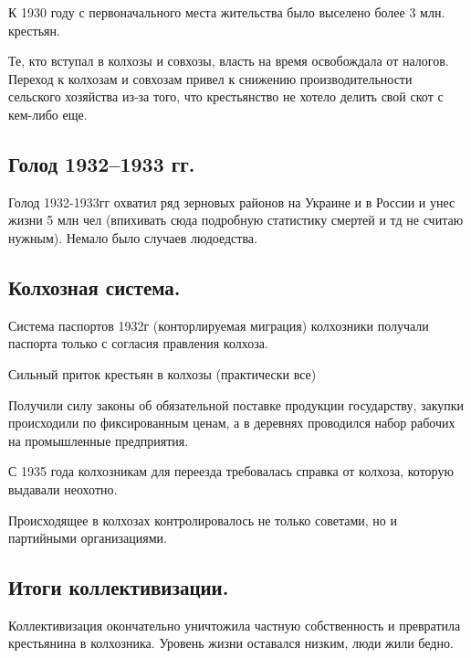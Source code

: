 К 1930 году с первоначального места жительства было выселено более 3 млн. крестьян.

Те, кто вступал в колхозы и совхозы, власть на время освобождала от налогов. Переход к колхозам и совхозам привел к снижению производительности сельского хозяйства из-за того, что крестьянство не хотело делить свой скот с кем-либо еще.

\subsection{Голод 1932--1933 гг.}

Голод 1932-1933гг охватил ряд зерновых районов на Украине и в России и унес жизни 5 млн чел (впихивать сюда подробную статистику смертей и тд не считаю нужным). Немало было случаев людоедства.

\subsection{Колхозная система.}

Система паспортов 1932г (конторлируемая миграция)
колхозники получали паспорта только с согласия правления колхоза.

Сильный приток крестьян в колхозы (практически все)

Получили силу законы об обязательной поставке продукции государству, закупки происходили по фиксированным ценам, а в деревнях проводился набор рабочих на промышленные предприятия. 

С 1935 года колхозникам для переезда требовалась справка от колхоза, которую выдавали неохотно.

Происходящее в колхозах контролировалось не только советами, но и партийными организациями.

\subsection{Итоги коллективизации.}

Коллективизация окончательно уничтожила частную собственность и превратила крестьянина в колхозника. Уровень жизни оставался низким, люди жили бедно. 
